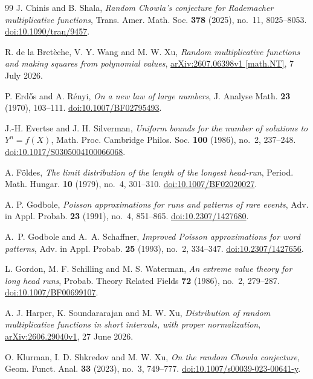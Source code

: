 \begin{thebibliography}{99}
J. Chinis and B. Shala,
\emph{Random Chowla's conjecture for Rademacher multiplicative functions},
Trans. Amer. Math. Soc. \textbf{378} (2025), no.~11, 8025--8053.
\href{https://doi.org/10.1090/tran/9457}{doi:10.1090/tran/9457}.

R. de la Bretèche, V. Y. Wang and M. W. Xu,
\emph{Random multiplicative functions and making squares from polynomial values},
\href{https://arxiv.org/abs/2607.06398v1}{arXiv:2607.06398v1 [math.NT]},
7 July 2026.

P. Erdős and A. Rényi,
\emph{On a new law of large numbers},
J. Analyse Math. \textbf{23} (1970), 103--111.
\href{https://doi.org/10.1007/BF02795493}{doi:10.1007/BF02795493}.

J.-H. Evertse and J. H. Silverman,
\emph{Uniform bounds for the number of solutions to $Y^n=f(X)$},
Math. Proc. Cambridge Philos. Soc. \textbf{100} (1986), no.~2, 237--248.
\href{https://doi.org/10.1017/S0305004100066068}{doi:10.1017/S0305004100066068}.

A. Földes,
\emph{The limit distribution of the length of the longest head-run},
Period. Math. Hungar. \textbf{10} (1979), no.~4, 301--310.
\href{https://doi.org/10.1007/BF02020027}{doi:10.1007/BF02020027}.

A. P. Godbole,
\emph{Poisson approximations for runs and patterns of rare events},
Adv. in Appl. Probab. \textbf{23} (1991), no.~4, 851--865.
\href{https://doi.org/10.2307/1427680}{doi:10.2307/1427680}.

A.~P. Godbole and A.~A. Schaffner,
\emph{Improved Poisson approximations for word patterns},
Adv. in Appl. Probab. \textbf{25} (1993), no.~2, 334--347.
\href{https://doi.org/10.2307/1427656}{doi:10.2307/1427656}.

L. Gordon, M. F. Schilling and M. S. Waterman,
\emph{An extreme value theory for long head runs},
Probab. Theory Related Fields \textbf{72} (1986), no.~2, 279--287.
\href{https://doi.org/10.1007/BF00699107}{doi:10.1007/BF00699107}.

A. J. Harper, K. Soundararajan and M. W. Xu,
\emph{Distribution of random multiplicative functions in short intervals,
with proper normalization},
\href{https://arxiv.org/abs/2606.29040v1}{arXiv:2606.29040v1}, 27 June 2026.

O. Klurman, I. D. Shkredov and M. W. Xu,
\emph{On the random Chowla conjecture},
Geom. Funct. Anal. \textbf{33} (2023), no.~3, 749--777.
\href{https://doi.org/10.1007/s00039-023-00641-y}{doi:10.1007/s00039-023-00641-y}.


\end{thebibliography}
